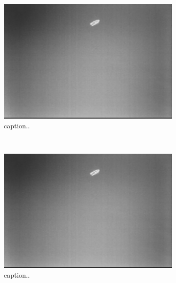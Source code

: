 \subsection{}
\begin{figure}[ht]
	\centering
	\begin{subfigure}[b]{0.45\textwidth}
		\includegraphics[width=\textwidth]{fig1}
		\caption{caption..}
		\label{fig:2a}
	\end{subfigure}
	~ %
	\begin{subfigure}[b]{0.45\textwidth}
		\includegraphics[width=\textwidth]{fig1}
		\caption{caption..}
		\label{fig:2b}
	\end{subfigure}
	\begin{subfigure}[b]{0.45\textwidth}

\end{subfigure}
\end{figure}
